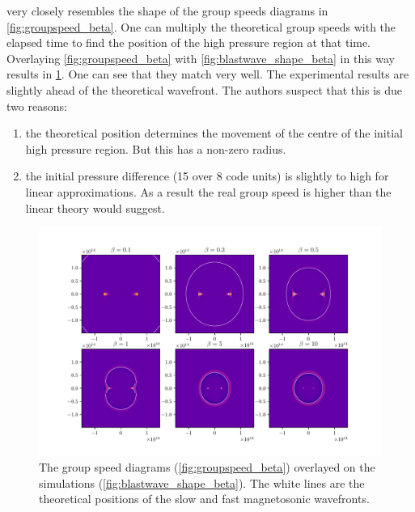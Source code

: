 \documentclass[a4paper]{article}
\numberwithin{figure}{section}
\numberwithin{equation}{section}
\begin{document}
 very closely resembles the shape of the group speeds diagrams in \cref{fig:groupspeed_beta}. 
One can multiply the theoretical group speeds with the elapsed time to find the position of the high pressure region at that time. 
Overlaying \cref{fig:groupspeed_beta} with \cref{fig:blastwave_shape_beta} in this way results in \cref{fig:comparison_groupspeed}. One can see that they match very well. 
The experimental results are slightly ahead of the theoretical wavefront. The authors suspect that this is due two reasons:
\begin{enumerate}
	\item the theoretical position determines the movement of the centre of the initial high pressure region. But this has a non-zero radius. 
	\item the initial pressure difference (15 over 8 code units) is slightly to high for linear approximations. As a result the real group speed is higher than the linear theory would suggest.
\end{enumerate}

\begin{figure}[h]
	\centering
	\includegraphics[width=\textwidth]{figures/comparison_groupspeed.pdf}
	\caption{The group speed diagrams (\cref{fig:groupspeed_beta}) overlayed on the simulations (\cref{fig:blastwave_shape_beta}). The white lines are the theoretical positions of the slow and fast magnetosonic wavefronts.}
	\label{fig:comparison_groupspeed}
\end{figure}
\end{document}
